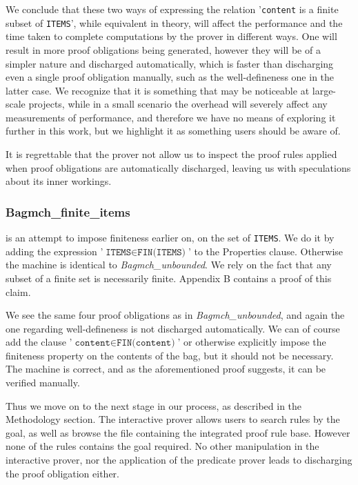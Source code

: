 \documentclass[11pt,journal]{IEEEtran}
\begin{document}
	We conclude that these two ways of expressing the relation '\texttt{content} is a finite subset of \texttt{ITEMS}', while equivalent in theory, will affect the performance and the time taken to complete computations by the prover in different ways. One will result in more proof obligations being generated, however they will be of a simpler nature and discharged automatically, which is faster than discharging even a single proof obligation manually, such as the well-defineness one in the latter case. We recognize that it is something that may be noticeable at large-scale projects, while in a small scenario the overhead will severely affect any measurements of performance, and therefore we have no means of exploring it further in this work, but we highlight it as something users should be aware of.
	
	It is regrettable that the prover not allow us to inspect the proof rules applied when proof obligations are automatically discharged, leaving us with speculations about its inner workings.
	       
	\subsubsection{Bagmch\_finite\_items} is an attempt to impose finiteness earlier on, on the set of \texttt{ITEMS}. We do it by adding the expression '$\texttt{ITEMS} \in \texttt{FIN(ITEMS)}$' to the Properties clause. Otherwise the machine is identical to \emph{Bagmch\_unbounded}. We rely on the fact that any subset of a finite set is necessarily finite. Appendix B contains a proof of this claim.
	
	We see the same four proof obligations as in \emph{Bagmch\_unbounded}, and again the one regarding well-defineness is not discharged automatically. We can of course add the clause '$\texttt{content} \in \texttt{FIN(content)}$' or otherwise explicitly impose the finiteness property on the contents of the bag, but it should not be necessary. The machine is correct, and as the aforementioned proof suggests, it can be verified manually.
	
	Thus we move on to the next stage in our process, as described in the Methodology section. The interactive prover allows users to search rules by the goal, as well as browse the file containing the integrated proof rule base. However none of the rules contains the goal required. No other manipulation in the interactive prover, nor the application of the predicate prover leads to discharging the proof obligation either.
	
\end{document}
